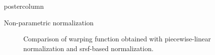 \documentclass[final, size=a0]{beamer}
\begin{document}
\begin{frame}
\begin{columns}
\begin{column}{.33\textwidth}
\begin{beamercolorbox}[center,wd=\textwidth]{postercolumn}
\begin{minipage}[T]{.95\textwidth}
{\begin{alertblock}{Non-parametric normalization}
              \begin{figure}
                \centering
                \hfill
                \hfill
                \caption{Comparison of warping function obtained with \protect{} piecewise-linear normalization and \protect{} \acs{srsf}-based normalization.}
                \label{fig:non-parametric}
              \end{figure}
              

\end{alertblock}}
\end{minipage}
\end{beamercolorbox}
\end{column}
\end{columns}
\end{frame}
\end{document}
